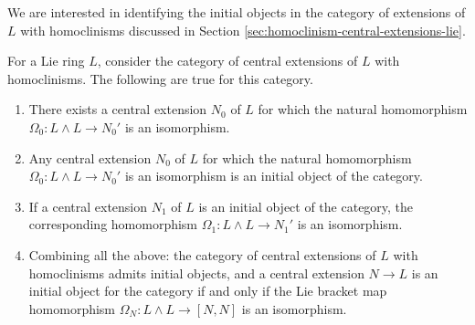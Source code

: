 We are interested in identifying the initial objects in the category
of extensions of $L$ with homoclinisms discussed in Section
\ref{sec:homoclinism-central-extensions-lie}.

\begin{lemma}\label{lemma:initobj-lie}
  For a Lie ring $L$, consider the category of central extensions of $L$
  with homoclinisms. The following are true for this category.
  \begin{enumerate}
  \item There exists a central extension $N_0$ of $L$ for which the
    natural homomorphism $\Omega_0: L \wedge L \to N_0'$ is an isomorphism.
  \item Any central extension $N_0$ of $L$ for which the natural
    homomorphism $\Omega_0:L \wedge L \to N_0'$ is an isomorphism is
    an initial object of the category.
  \item If a central extension $N_1$ of $L$ is an initial object of
    the category, the corresponding homomorphism $\Omega_1:L \wedge L
    \to N_1'$ is an isomorphism.
  \item Combining all the above: the category of central extensions of
    $L$ with homoclinisms admits initial objects, and a central
    extension $N \to L$ is an initial object for the category if and
    only if the Lie bracket map homomorphism $\Omega_N: L \wedge L \to
    [N,N]$ is an isomorphism.
  \end{enumerate}
\end{lemma}

